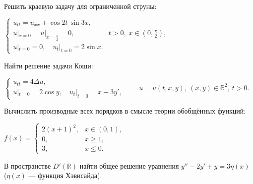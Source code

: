 
\begin{cond}
\end{cond}

\begin{cond}
\end{cond}

\begin{cond}
	Решить краевую задачу для ограниченной струны:

	\(
	\begin{cases}
		u_{tt} = u_{xx} + \cos 2t \,\sin 3x,                                                \\
		u|_{x=0} = u|_{x=\frac{\pi}{2}} = 0, & t > 0,\; x \in \left(0,\frac{\pi}{2}\right), \\
		u|_{t=0} = 0,\quad u_t|_{t=0} = 2\sin x.
	\end{cases}
	\)
\end{cond}

\begin{cond}
	Найти решение задачи Коши:

	\(
	\begin{cases}
		u_{tt} = 4\Delta u, \\
		u|_{t=0} = 2\cos y,\quad u_t|_{t=0} = x - 3y',
	\end{cases}
	\qquad
	u = u(t,x,y),\ (x,y)\in\mathbb{R}^2,\ t>0.
	\)
\end{cond}

\begin{cond}
	Вычислить производные всех порядков в смысле теории обобщённых функций:

	\(
	f(x) =
	\begin{cases}
		2(x+1)^2, & x \in (0,1), \\
		0,        & x \ge 1,     \\
		3,        & x \le 0.
	\end{cases}
	\)
\end{cond}

\begin{cond}
	В пространстве \(D'(\mathbb{R})\) найти общее решение уравнения
	$y'' - 2y' + y = 3\eta(x)$ \;(\(\eta(x)\) — функция Хэвисайда).
\end{cond}
